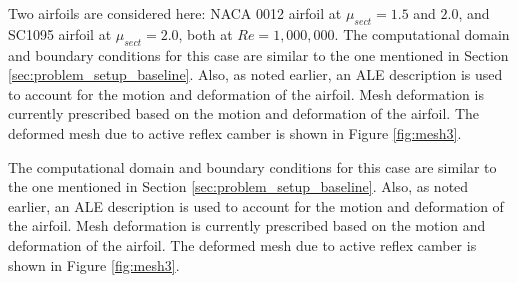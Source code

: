 Two airfoils are considered here: NACA 0012 airfoil at $\mu_{sect}=1.5$ and $2.0$, and SC1095 airfoil at $\mu_{sect}=2.0$, both at $Re = 1,000,000$.
The computational domain and boundary conditions for this case are similar to the one mentioned in Section \ref{sec:problem_setup_baseline}.
Also, as noted earlier, an ALE description is used to account for the motion and deformation of the airfoil.
Mesh deformation is currently prescribed based on the motion and deformation of the airfoil.
The deformed mesh due to active reflex camber is shown in Figure \ref{fig:mesh3}.

The computational domain and boundary conditions for this case are similar to the one mentioned in Section \ref{sec:problem_setup_baseline}.
Also, as noted earlier, an ALE description is used to account for the motion and deformation of the airfoil.
Mesh deformation is currently prescribed based on the motion and deformation of the airfoil.
The deformed mesh due to active reflex camber is shown in Figure \ref{fig:mesh3}.


